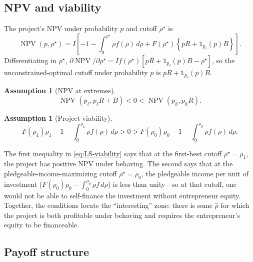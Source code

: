 \documentclass[11pt,a4paper,oneside]{book}
\DeclareMathOperator{\NPV}{NPV}
\theoremstyle{plain}
\theoremstyle{definition}
\newtheorem{assumption}[theorem]{Assumption}
\theoremstyle{remark}
\numberwithin{equation}{chapter}
\begin{document}
\subsection{NPV and viability}

The project's NPV under probability $p$ and cutoff $\rho^\star$ is
\begin{equation}\label{eq:LS-NPV}
  \NPV(p, \rho^\star) = I \left[ -1 - \int_0^{\rho^\star} \rho f(\rho) \, d\rho + F(\rho^\star) \left\{ pR + \mathbb{1}_{p_\ell}(p) B \right\} \right].
\end{equation}
Differentiating in $\rho^\star$, $\partial \NPV/\partial \rho^\star = I f(\rho^\star) [pR + \mathbb{1}_{p_\ell}(p) B - \rho^\star]$, so the unconstrained-optimal cutoff under probability $p$ is $pR + \mathbb{1}_{p_\ell}(p) B$.

\begin{assumption}[NPV at extremes]\label{ass:LS-extremes}
\begin{equation}\label{eq:LS-extremes}
  \NPV(p_\ell, p_\ell R + B) < 0 < \NPV(p_h, p_h R).
\end{equation}
\end{assumption}

\begin{assumption}[Project viability]\label{ass:LS-viability}
\begin{equation}\label{eq:LS-viability}
  F(\rho_1) \rho_1 - 1 - \int_0^{\rho_1} \rho f(\rho) \, d\rho > 0 > F(\rho_0) \rho_0 - 1 - \int_0^{\rho_0} \rho f(\rho) \, d\rho.
\end{equation}
\end{assumption}

The first inequality in \eqref{eq:LS-viability} says that at the first-best cutoff $\rho^\star = \rho_1$, the project has positive NPV under behaving.
The second says that at the pledgeable-income-maximizing cutoff $\rho^\star = \rho_0$, the pledgeable income per unit of investment ($F(\rho_0)\rho_0 - \int_0^{\rho_0}\rho f \, d\rho$) is less than unity---so at that cutoff, one would not be able to self-finance the investment without entrepreneur equity.
Together, the conditions locate the ``interesting'' zone: there is some $\widehat{\rho}$ for which the project is both profitable under behaving and requires the entrepreneur's equity to be financeable.

\subsection{Payoff structure}
\end{document}
